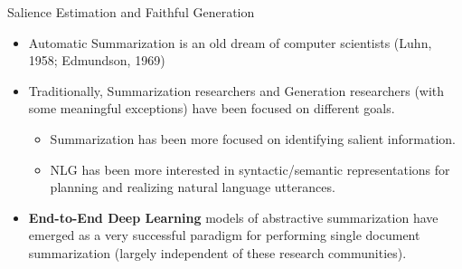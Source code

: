 \begin{frame}{Salience Estimation and Faithful Generation}

\begin{itemize}

\item Automatic Summarization is an old dream of computer scientists (Luhn, 1958; Edmundson, 1969) 

\vspace{20pt}

\item Traditionally, Summarization researchers and Generation researchers
    (with some meaningful exceptions) have been focused on different goals.

\begin{itemize}

  \item Summarization has been more focused on identifying salient information.
  \item NLG has been more interested in syntactic/semantic representations for
        planning and realizing natural language utterances.

\end{itemize}

\vspace{20pt}

\item \textbf{End-to-End Deep Learning} models of abstractive summarization
    have emerged as a very successful paradigm for performing single document
    summarization (largely independent of these research communities).
        
\end{itemize}
\end{frame}

